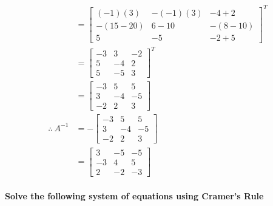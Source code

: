 \documentclass[
  letterpaper,
  DIV=11,
  numbers=noendperiod]{scrartcl}
\let\oldparagraph\paragraph
\renewcommand{\paragraph}[1]{\oldparagraph{#1}\mbox{}}
\begin{document}
\begin{align*}
&= \begin{bmatrix}(-1)(3) & -(-1)(3) & -4+2 \\ -(15-20) & 6-10 & -(8-10) \\ 5 & -5 & -2+5\end{bmatrix}^T \\
&= \begin{bmatrix}-3 & 3 & -2 \\ 5 & -4 & 2 \\ 5 & -5 & 3\end{bmatrix}^T \\
&= \begin{bmatrix}-3 & 5 & 5 \\ 3 & -4 & -5 \\ -2 & 2 & 3\end{bmatrix} \\
\therefore \ A^{-1} &= -\begin{bmatrix}-3 & 5 & 5 \\ 3 & -4 & -5 \\ -2 & 2 & 3\end{bmatrix} \\
&= \begin{bmatrix}3 & -5 & -5 \\ -3 & 4 & 5 \\ 2 & -2 & -3\end{bmatrix}
\end{align*}

\newpage{}

\paragraph{Solve the following system of equations using Cramer's
Rule}\label{solve-the-following-system-of-equations-using-cramers-rule}
\end{document}
